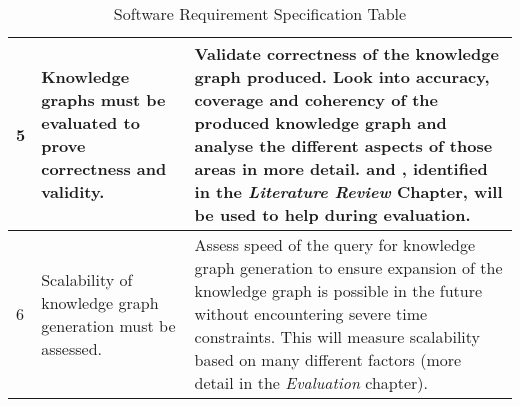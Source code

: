 \begin{longtable}{|p{2.25cm}|p{4.5cm}|p{6.5cm}|}
5&
Knowledge graphs must be evaluated to prove correctness and validity. &
Validate correctness of the knowledge graph produced. Look into accuracy, coverage and coherency of the produced knowledge graph and analyse the different aspects of those areas in more detail. \cite{knowledgegraphevaulationbook} and \cite{evaluationpaper}, identified in the \textit{Literature Review} Chapter, will be used to help during evaluation. \\ 
\hline

6&
Scalability of knowledge graph generation must be assessed. &
Assess speed of the query for knowledge graph generation to ensure expansion of the knowledge graph is possible in the future without encountering severe time constraints. This will measure scalability based on many different factors (more detail in the \textit{Evaluation} chapter). 
\hline
\caption{Software Requirement Specification Table}
\end{longtable}

